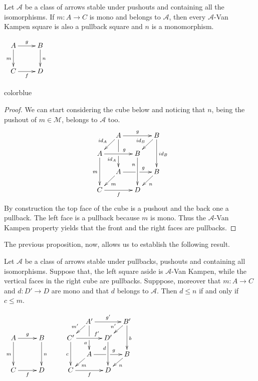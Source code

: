 \documentclass[a4paper,UKenglish,cleveref,pdftex,thm-restate,numberwithinsect,anonymous]{lipics}
\newcommand{\full}[1]{{color{blue}#1}}
\newcommand{\full}[1]{}
\newcommand{\id}[1]{\mathsf{id}_{#1}}
\def\C{\textbf {\textup{C}}}
\begin{document}
\noindent 
\parbox{11.5cm}{\begin{proposition}\label{prop:pbpo} Let $\mathcal{A}$ be a class of arrows stable under pushouts and containing all the isomorphisms.  If $m\colon A\to C$ is mono and belongs to $\mathcal{A}$, then every $\mathcal{A}$-Van Kampen square
	is also a pullback square and $n$ is a monomorphism.
\end{proposition}}
\parbox{2cm}{\vspace{1.5ex}$\xymatrix{A\ar[r]^{g} \ar[d]_{m} & B \ar[d]^{n} \\ C \ar[r]_{f}  & D}$}

\full{ 
\begin{proof}
	We can start considering the cube below and noticing that $n$, being the pushout of $m\in \mathcal{M}$, belongs to $\mathcal{A}$ too.
	\[\xymatrix@C=13pt@R=13pt{&A\ar[dd]|\hole_(.65){\id{A}}\ar[rr]^{g} \ar[dl]_{\id{A}} && B \ar[dd]^{\id{B}} \ar[dl]_{\id{B}} \\ A  \ar[dd]_{m}\ar[rr]^(.65){g} & & B \ar[dd]_(.3){n}\\&A\ar[rr]|\hole^(.65){g} \ar[dl]^{m} && B \ar[dl]^{n} \\C \ar[rr]_{f} & & D}\]
	By construction the top face of the cube is a pushout and the back one a pullback. The left face is a pullback because $m$ is mono. Thus the $\mathcal{A}$-Van Kampen property yields that the front and the right faces are pullbacks.
\end{proof}}

The previous proposition, now, allows us to establish the following result.

\noindent \parbox{7.4cm}{
\begin{lemma}\label{lem:varie}Let $\mathcal{A}$ be a class of arrows stable under pullbacks, pushouts and containing all isomorphisms.  Suppose that, the left square aside is $\mathcal{A}$-Van Kampen, while the vertical faces in the right cube are pullbacks. 	Supppose, moreover that $m\colon A\to C$ and $d\colon D'\to D$ are mono and that $d$ belongs to $\mathcal{A}$. Then $d\leq n$ if and only if $c \leq m$.
\end{lemma}}
	\parbox{6cm}{$\xymatrix@C=10pt@R=10pt{&&&&&A'\ar[dd]|\hole_(.65){a}\ar[rr]^{g'} \ar[dl]_{m'} && B' \ar[dd]^{b} \ar[dl]_{n'} \\ A \ar[dd]_{m}\ar[rr]^{g}&&B\ar[dd]^{n}&&C'  \ar[dd]_{c}\ar[rr]^(.7){f'} & & D' \ar[dd]_(.3){d}\\&&&&&A\ar[rr]|\hole^(.65){g} \ar[dl]^{m} && B \ar[dl]^{n} \\C\ar[rr]_{f} &&D&&C \ar[rr]_{f} & & D}$}
\end{document}

